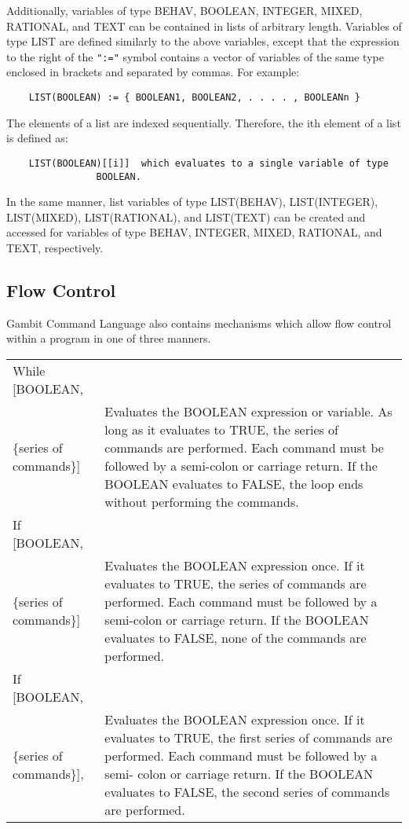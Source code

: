 \medskip

\noindent
Additionally, variables of type  BEHAV, BOOLEAN, INTEGER, MIXED, RATIONAL, and 
TEXT can be contained in lists of arbitrary length.  Variables of type LIST are
defined similarly to the above variables, except that the expression to the 
right of the {\tt ":="} symbol contains a vector of variables of the same 
type enclosed in brackets and separated by commas.  For example:

\begin{verbatim}
	LIST(BOOLEAN) := { BOOLEAN1, BOOLEAN2, . . . . , BOOLEANn }
\end{verbatim}

The elements of a list are indexed sequentially.  Therefore, the ith element of
a list is defined as:

\begin{verbatim}
	LIST(BOOLEAN)[[i]]	which evaluates to a single variable of type 
				BOOLEAN.
\end{verbatim}

\noindent
In the same manner, list variables of type LIST(BEHAV), LIST(INTEGER), 
LIST(MIXED), LIST(RATIONAL), and LIST(TEXT) can be created and accessed for 
variables of type BEHAV, INTEGER, MIXED, RATIONAL, and TEXT, respectively.

\subsection*{Flow Control}

Gambit Command Language also contains mechanisms which allow flow control 
within a program in one of three manners.

\medskip

\begin{tabular}{lp{4in}}
While [BOOLEAN, &\\
\{series of commands\}] & Evaluates the BOOLEAN
expression or variable.  As long as it evaluates to TRUE, the series
of commands are performed.  Each command must be followed by a
semi-colon or carriage return.  If the BOOLEAN evaluates to FALSE, the
loop ends without performing the commands.\\
If [BOOLEAN, & \\
\{series of commands\}] & Evaluates the BOOLEAN expression
once. If it evaluates to TRUE, the series of commands are performed.
Each command must be followed by a semi-colon or carriage return.  If
the BOOLEAN evaluates to FALSE, none of the commands are performed.\\
If [BOOLEAN, & \\
\{series of commands\}], & Evaluates the BOOLEAN expression
once. If it evaluates to TRUE, the first series of commands are
performed.  Each command must be followed by a semi-
colon or carriage return.  If the BOOLEAN evaluates to FALSE, the second
series of commands are performed. \\
\end{tabular}	

